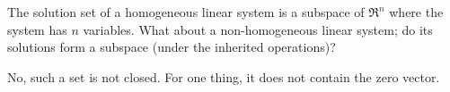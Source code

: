 

\begin{Exercise}[
name={},
title={}, 
difficulty=0,
origin={\cite{JH}}]
The solution set of a homogeneous linear system is a subspace of $\Re^n$ where
the system has $n$ variables.
What about a non-homogeneous linear system; do its solutions form a 
subspace (under the inherited operations)?

\end{Exercise}

\begin{Answer}
No, such a set is not closed.
For one thing, it does not contain the zero vector.  

\end{Answer}
